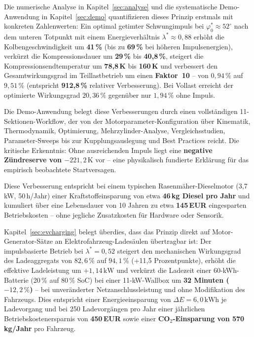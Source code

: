 ﻿\documentclass[a4paper,12pt]{article}
\begin{document}
Die numerische Analyse in Kapitel~\ref{sec:analyse} und die systematische
Demo-Anwendung in Kapitel~\ref{sec:demo} quantifizieren dieses Prinzip
erstmals mit konkreten Zahlenwerten: Ein optimal getimter Schwungimpuls
bei $\varphi_0^* \approx 52^\circ$ nach dem unteren Totpunkt mit einem
Energieverhältnis $\lambda^* \approx 0{,}88$ erhöht die Kolbengeschwindigkeit
um \textbf{41\,\%} (bis zu \textbf{69\,\%} bei höheren Impulsenergien),
verkürzt die Kompressionsdauer um \textbf{29\,\%} bis \textbf{40{,}8\,\%},
steigert die Kompressionsendtemperatur um \textbf{78{,}8\,K} bis \textbf{160\,K}
und verbessert den Gesamtwirkungsgrad im Teillastbetrieb um einen
\textbf{Faktor~10} -- von $0{,}94\,\%$ auf $9{,}51\,\%$ (entspricht
\textbf{912{,}8\,\%} relativer Verbesserung). Bei Vollast erreicht der
optimierte Wirkungsgrad $20{,}36\,\%$ gegenüber nur $1{,}94\,\%$ ohne Impuls.

Die Demo-Anwendung belegt diese Verbesserungen durch einen vollständigen
11-Sektionen-Workflow, der von der Motorparameter-Konfiguration über
Kinematik, Thermodynamik, Optimierung, Mehrzylinder-Analyse, Vergleichsstudien,
Parameter-Sweeps bis zur Kupplungsauslegung und Best Practices reicht.
Die kritische Erkenntnis: Ohne ausreichenden Impuls liegt eine
\textbf{negative Zündreserve von $-221{,}2\,\text{K}$} vor -- eine
physikalisch fundierte Erklärung für das empirisch beobachtete Startversagen.

Diese Verbesserung entspricht bei einem typischen Rasenmäher-Dieselmotor
(3{,}7\,kW, 50\,h/Jahr) einer Kraftstoffeinsparung von etwa
\textbf{46\,kg Diesel pro Jahr} und kumuliert über eine Lebensdauer von
10 Jahren zu etwa \textbf{145\,EUR} eingesparten Betriebskosten -- ohne
jegliche Zusatzkosten für Hardware oder Sensorik.

Kapitel~\ref{sec:evcharging} belegt überdies, dass das Prinzip direkt
auf Motor-Generator-Sätze an Elektrofahrzeug-Ladesäulen übertragbar ist:
Der impulsbasierte Betrieb bei $\lambda^* = 0{,}52$ steigert den mechanischen
Wirkungsgrad des Ladeaggregats von $82{,}6\,\%$ auf $94{,}1\,\%$
(+11{,}5 Prozentpunkte), erhöht die effektive Ladeleistung um
\textbf{$+1{,}14\,\text{kW}$} und verkürzt die Ladezeit einer 60-kWh-Batterie
(20\,\% auf 80\,\% SoC) bei einer 11-kW-Wallbox um
\textbf{32 Minuten ($-12{,}2\,\%$)} -- bei unveränderter
Netzanschlussleistung und ohne Modifikation des Fahrzeugs.
Dies entspricht einer Energieeinsparung von $\Delta E = 6{,}0\,\text{kWh}$
je Ladevorgang und bei 250 Ladevorgängen pro Jahr einer jährlichen
Betriebskostenersparnis von \textbf{450\,EUR} sowie einer
\textbf{CO${}_2$-Einsparung von 570\,kg/Jahr} pro Fahrzeug.
\end{document}
